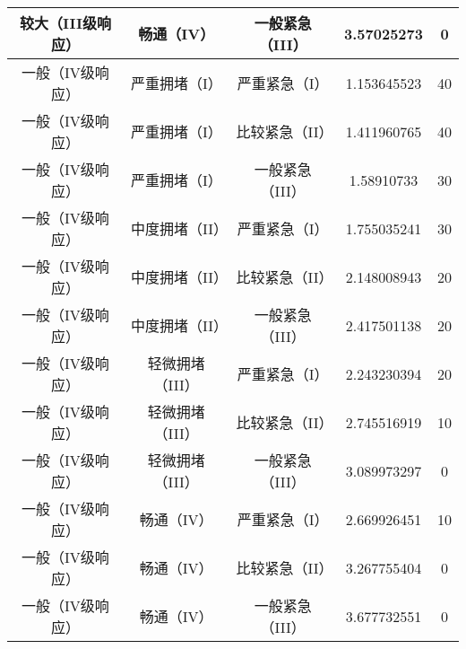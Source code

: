 \begin{center}
\begin{longtable}{|c|c|c|c|c|}
		较大（III级响应）&  畅通（IV）&	 一般紧急（III）	      &    3.57025273  &  0\\ \hline
		一般（IV级响应）&   严重拥堵（I）&	严重紧急（I）	        &    1.153645523	 & 40\\ \hline
		一般（IV级响应）&   严重拥堵（I）&	比较紧急（II）	      &  1.411960765	 & 40\\ \hline
		一般（IV级响应）&   严重拥堵（I）&	一般紧急（III）	      &  1.58910733	 & 30\\ \hline
		一般（IV级响应）&   中度拥堵（II）&  严重紧急（I）	      &      1.755035241	 & 30\\ \hline
		一般（IV级响应）&   中度拥堵（II）&  比较紧急（II）      &  	2.148008943	 & 20\\ \hline
		一般（IV级响应）&   中度拥堵（II）&  一般紧急（III）      &  	2.417501138	 & 20\\ \hline
		一般（IV级响应）&   轻微拥堵（III）& 严重紧急（I）	      &      2.243230394	 & 20\\  \hline
		一般（IV级响应）&   轻微拥堵（III）& 比较紧急（II）      &  	2.745516919	 & 10\\ \hline
		一般（IV级响应）&   轻微拥堵（III）& 一般紧急（III）      &  	3.089973297 & 	0\\ \hline
		一般（IV级响应）&   畅通（IV）&     严重紧急（I）      &  	  2.669926451  & 10\\ \hline
		一般（IV级响应）&   畅通（IV）&     比较紧急（II）      &  	  3.267755404 &  0\\ \hline
		一般（IV级响应）&   畅通（IV）&     一般紧急（III）      &  	  3.677732551 &  0\\ \hline
	\end{longtable}
\end{center}






